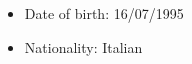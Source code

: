 \begin{itemize}
    \item Date of birth: 16/07/1995 \vspace{-0.2cm}
    \item Nationality: Italian 
\end{itemize}
